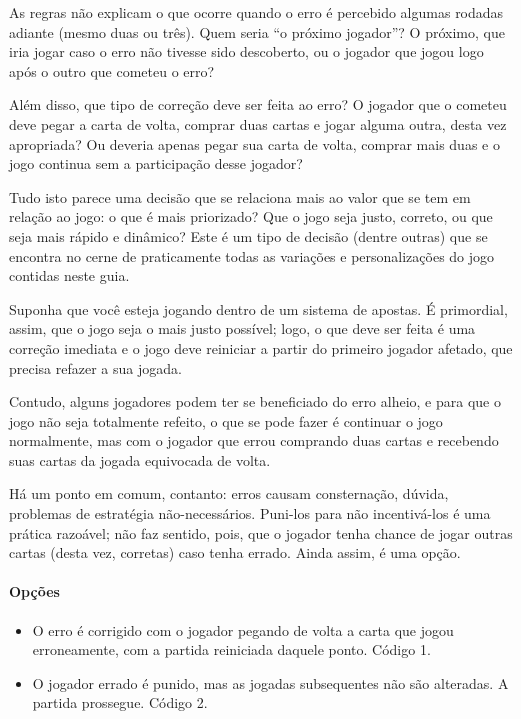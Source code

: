 As regras não explicam o que ocorre quando o erro é percebido algumas rodadas adiante (mesmo duas ou três). Quem seria ``o próximo jogador''? O próximo, que iria jogar caso o erro não tivesse sido descoberto, ou o jogador que jogou logo após o outro que cometeu o erro?

Além disso, que tipo de correção deve ser feita ao erro? O jogador que o cometeu deve pegar a carta de volta, comprar duas cartas e jogar alguma outra, desta vez apropriada? Ou deveria apenas pegar sua carta de volta, comprar mais duas e o jogo continua sem a participação desse jogador?

Tudo isto parece uma decisão que se relaciona mais ao valor que se tem em relação ao jogo: o que é mais priorizado? Que o jogo seja justo, correto, ou que seja mais rápido e dinâmico? Este é um tipo de decisão (dentre outras) que se encontra no cerne de praticamente todas as variações e personalizações do jogo contidas neste guia.

Suponha que você esteja jogando dentro de um sistema de apostas. É primordial, assim, que o jogo seja o mais justo possível; logo, o que deve ser feita é uma correção imediata e o jogo deve reiniciar a partir do primeiro jogador afetado, que precisa refazer a sua jogada.

Contudo, alguns jogadores podem ter se beneficiado do erro alheio, e para que o jogo não seja totalmente refeito, o que se pode fazer é continuar o jogo normalmente, mas com o jogador que errou comprando duas cartas e recebendo suas cartas da jogada equivocada de volta.

Há um ponto em comum, contanto: erros causam consternação, dúvida, problemas de estratégia não-necessários. Puni-los para não incentivá-los é uma prática razoável; não faz sentido, pois, que o jogador tenha chance de jogar outras cartas (desta vez, corretas) caso tenha errado. Ainda assim, é uma opção.

\paragraph{Opções}

\begin{itemize}
\item{O erro é corrigido com o jogador pegando de volta a carta que jogou erroneamente, com a partida reiniciada daquele ponto. Código 1.}
\item{O jogador errado é punido, mas as jogadas subsequentes não são alteradas. A partida prossegue. Código 2.}
\end{itemize}

